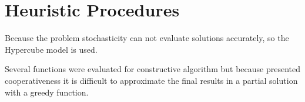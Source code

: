 \chapter{Heuristic Procedures}
Because the problem stochasticity
can not evaluate solutions accurately,
so the Hypercube model is used.

Several functions were evaluated
for constructive algorithm
but because presented cooperativeness
it is difficult
to approximate the final results
in a partial solution
with a greedy function.




